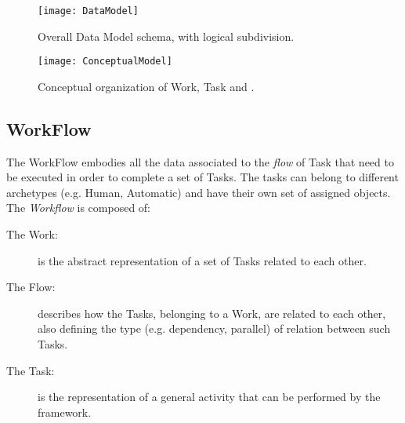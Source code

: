 \begin{figure}[htb]
    \centering
    \texttt{[image: DataModel]}
    \caption{Overall Data Model schema, with logical subdivision.}
    \label{fig:data-model}
\end{figure}
\begin{figure}[htb]
    \centering
    \texttt{[image: ConceptualModel]}
    \caption{Conceptual organization of Work, Task and \utask{}.}
    \label{fig:conceptual-model}
\end{figure}

\subsection{WorkFlow}
The WorkFlow embodies all the data associated to the \emph{flow} of Task
that need to be executed in order to complete a set of Tasks. The tasks can belong
to different archetypes (e.g. Human, Automatic) and have their own set of assigned
objects. The \emph{Workflow} is composed of:
\begin{description}
    \item[The Work:] is the abstract representation of a set of Tasks related
    to each other.
    \item[The Flow:] describes how the Tasks, belonging to a Work, are related
    to each other, also defining the type (e.g. dependency, parallel) of relation
    between such Tasks. 
    \item[The Task:] is the representation of a general activity that can be
    performed by the framework.
\end{description}

